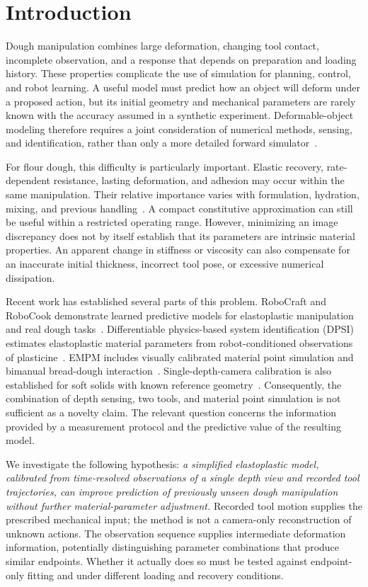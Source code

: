 \section{Introduction}
\label{sec:introduction}

Dough manipulation combines large deformation, changing tool contact, incomplete observation, and a response that depends on preparation and loading history. These properties complicate the use of simulation for planning, control, and robot learning. A useful model must predict how an object will deform under a proposed action, but its initial geometry and mechanical parameters are rarely known with the accuracy assumed in a synthetic experiment. Deformable-object modeling therefore requires a joint consideration of numerical methods, sensing, and identification, rather than only a more detailed forward simulator~\cite{review2020}.

For flour dough, this difficulty is particularly important. Elastic recovery, rate-dependent resistance, lasting deformation, and adhesion may occur within the same manipulation. Their relative importance varies with formulation, hydration, mixing, and previous handling~\cite{yazar2023}. A compact constitutive approximation can still be useful within a restricted operating range. However, minimizing an image discrepancy does not by itself establish that its parameters are intrinsic material properties. An apparent change in stiffness or viscosity can also compensate for an inaccurate initial thickness, incorrect tool pose, or excessive numerical dissipation.

Recent work has established several parts of this problem. RoboCraft and RoboCook demonstrate learned predictive models for elastoplastic manipulation and real dough tasks~\cite{robocraft2022,robocook2023}. Differentiable physics-based system identification (DPSI) estimates elastoplastic material parameters from robot-conditioned observations of plasticine~\cite{dpsi2025}. EMPM includes visually calibrated material point simulation and bimanual bread-dough interaction~\cite{empm2026}. Single-depth-camera calibration is also established for soft solids with known reference geometry~\cite{diffcal2023}. Consequently, the combination of depth sensing, two tools, and material point simulation is not sufficient as a novelty claim. The relevant question concerns the information provided by a measurement protocol and the predictive value of the resulting model.

We investigate the following hypothesis: \emph{a simplified elastoplastic model, calibrated from time-resolved observations of a single depth view and recorded tool trajectories, can improve prediction of previously unseen dough manipulation without further material-parameter adjustment.} Recorded tool motion supplies the prescribed mechanical input; the method is not a camera-only reconstruction of unknown actions. The observation sequence supplies intermediate deformation information, potentially distinguishing parameter combinations that produce similar endpoints. Whether it actually does so must be tested against endpoint-only fitting and under different loading and recovery conditions.

